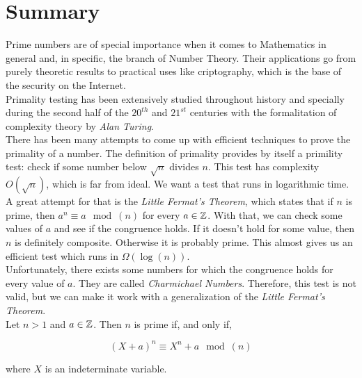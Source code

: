 %

\chapter{Summary}

Prime numbers are of special importance when it comes to Mathematics in general and, in specific, the branch of Number Theory. Their applications go from purely theoretic results to practical uses like criptography, which is the base of the security on the Internet.\\

Primality testing has been extensively studied throughout history and specially during the second half of the $20^{th}$ and $21^{st}$ centuries with the formalitation of complexity theory by \textit{Alan Turing}.\\

There has been many attempts to come up with efficient techniques to prove the primality of a number. The definition of primality provides by itself a primility test: check if some number below $\sqrt{n}$ divides $n$. This test has complexity $O(\sqrt{n})$, which is far from ideal. We want a test that runs in logarithmic time. A great attempt for that is the \textit{Little Fermat's Theorem}, which states that if $n$ is prime, then $a^n \equiv a \mod(n)$ for every $a \in \mathbb{Z}$. With that, we can check some values of $a$ and see if the congruence holds. If it doesn't hold for some value, then $n$ is definitely composite. Otherwise it is probably prime. This almost gives us an efficient test which runs in $\Omega(\log(n))$.\\

Unfortunately, there exists some numbers for which the congruence holds for every value of $a$. They are called \textit{Charmichael Numbers}. Therefore, this test is not valid, but we can make it work with a generalization of the \textit{Little Fermat's Theorem}.\\

Let $n > 1$ and $a \in \mathbb{Z}$. Then $n$ is prime if, and only if,

\begin{equation}
(X + a)^n \equiv X^n + a \mod(n)
\end{equation}

where $X$ is an indeterminate variable.\\

